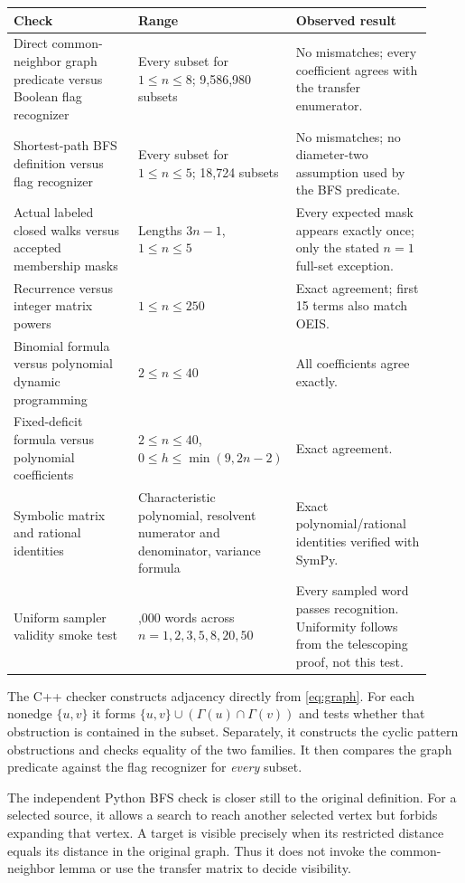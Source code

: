 \documentclass[11pt,a4paper]{article}
\theoremstyle{definition}
\newcommand{\Ngraph}{\Gamma}
\begin{document}
\begin{center}
\small
\begin{tabular}{@{}>{\raggedright\arraybackslash}p{0.31\linewidth}>{\raggedright\arraybackslash}p{0.28\linewidth}>{\raggedright\arraybackslash}p{0.33\linewidth}@{}}
\toprule
Check & Range & Observed result\\
\midrule
Direct common-neighbor graph predicate versus Boolean flag recognizer
& Every subset for $1\le n\le8$; 9,586,980 subsets
& No mismatches; every coefficient agrees with the transfer enumerator.\\[4pt]
Shortest-path BFS definition versus flag recognizer
& Every subset for $1\le n\le5$; 18,724 subsets
& No mismatches; no diameter-two assumption used by the BFS predicate.\\[4pt]
Actual labeled closed walks versus accepted membership masks
& Lengths $3n-1$, $1\le n\le5$
& Every expected mask appears exactly once; only the stated $n=1$ full-set exception.\\[4pt]
Recurrence versus integer matrix powers
& $1\le n\le250$
& Exact agreement; first 15 terms also match OEIS.\\[4pt]
Binomial formula versus polynomial dynamic programming
& $2\le n\le40$
& All coefficients agree exactly.\\[4pt]
Fixed-deficit formula versus polynomial coefficients
& $2\le n\le40$, $0\le h\le\min(9,2n-2)$
& Exact agreement.\\[4pt]
Symbolic matrix and rational identities
& Characteristic polynomial, resolvent numerator and denominator, variance formula
& Exact polynomial/rational identities verified with SymPy.\\[4pt]
Uniform sampler validity smoke test
& 7,000 words across $n=1,2,3,5,8,20,50$
& Every sampled word passes recognition. Uniformity follows from the telescoping proof, not this test.\\
\bottomrule
\end{tabular}
\end{center}

The C++ checker constructs adjacency directly from \cref{eq:graph}.
For each nonedge $\{u,v\}$ it forms
$\{u,v\}\cup(\Ngraph(u)\cap\Ngraph(v))$ and tests whether that obstruction
is contained in the subset. Separately, it constructs the cyclic pattern
obstructions and checks equality of the two families. It then compares the
graph predicate against the flag recognizer for \emph{every} subset.

The independent Python BFS check is closer still to the original definition.
For a selected source, it allows a search to reach another selected vertex
but forbids expanding that vertex. A target is visible precisely when its
restricted distance equals its distance in the original graph. Thus it does
not invoke the common-neighbor lemma or use the transfer matrix to decide
visibility.
\end{document}
